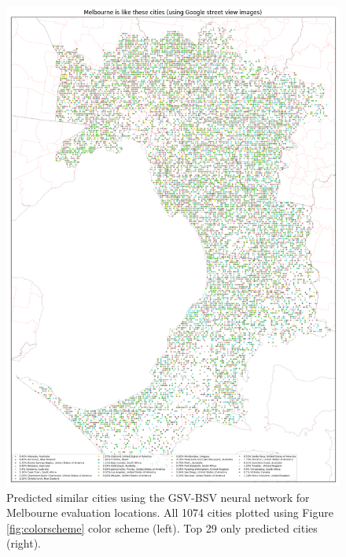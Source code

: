 \documentclass[sageh,times]{sagej}
\begin{document}
\begin{figure}[!htbp]
\includegraphics[scale=0.20]{Images/MelbourneOverallAbrev_street.png} 
\caption{Predicted similar cities using the GSV-BSV neural network for Melbourne evaluation locations. All 1074 cities plotted using Figure \ref{fig:colorscheme} color scheme (left). Top 29 only predicted cities (right).}    
 \label{fig:melstreet}  
\end{figure} 
\end{document}

